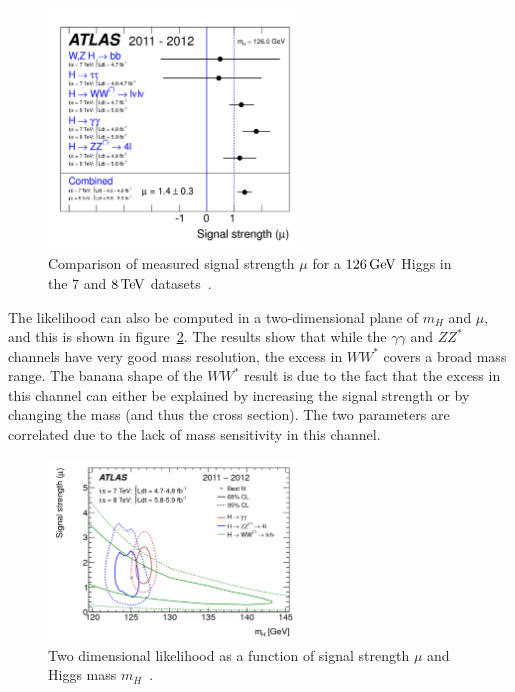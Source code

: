 \begin{figure}[h!]
  \centering
  \captionsetup{justification=centering}
  \includegraphics[width=0.6\textwidth]{figures/discovery_mu}
  \caption{Comparison of measured signal strength $\mu$ for a $126 \GeV$ Higgs in the $7$ and $8 \TeV$ datasets~\cite{Discovery}.}
  \label{fig:discovery_mu}
\end{figure}

The likelihood can also be computed in a two-dimensional plane of $m_{H}$ and $\mu$, and this is shown in figure~\ref{fig:disc_2d}. The results show that while the $\gamma\gamma$ and $ZZ^*$ channels have very good mass resolution, the excess in $WW^*$ covers a broad mass range. The banana shape of the $WW^*$ result is due to the fact that the excess in this channel can either be explained by increasing the signal strength or by changing the mass (and thus the cross section). The two parameters are correlated due to the lack of mass sensitivity in this channel. 

\begin{figure}[h!]
  \centering
  \captionsetup{justification=centering}
  \includegraphics[width=0.6\textwidth]{figures/disc_2d}
  \caption{Two dimensional likelihood as a function of signal strength $\mu$ and Higgs mass $m_H$~\cite{Discovery}.}
  \label{fig:disc_2d}
\end{figure}

